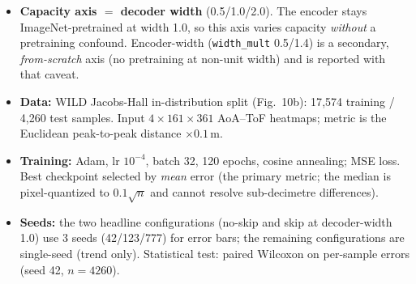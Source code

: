 \documentclass[11pt]{article}
\begin{document}
\begin{itemize}[nosep,leftmargin=1.4em]
\item \textbf{Capacity axis $=$ decoder width} (0.5/1.0/2.0). The encoder stays
      ImageNet-pretrained at width 1.0, so this axis varies capacity \emph{without} a
      pretraining confound. Encoder-width (\texttt{width\_mult} 0.5/1.4) is a secondary,
      \emph{from-scratch} axis (no pretraining at non-unit width) and is reported with that caveat.
\item \textbf{Data:} WILD Jacobs-Hall in-distribution split (Fig.\ 10b): 17{,}574 training /
      4{,}260 test samples. Input $4\times161\times361$ AoA--ToF heatmaps; metric is the
      Euclidean peak-to-peak distance $\times0.1$\,m.
\item \textbf{Training:} Adam, lr $10^{-4}$, batch 32, 120 epochs, cosine annealing; MSE loss.
      Best checkpoint selected by \emph{mean} error (the primary metric; the median is
      pixel-quantized to $0.1\sqrt{n}$ and cannot resolve sub-decimetre differences).
\item \textbf{Seeds:} the two headline configurations (no-skip and skip at decoder-width 1.0)
      use 3 seeds (42/123/777) for error bars; the remaining configurations are single-seed
      (trend only). Statistical test: paired Wilcoxon on per-sample errors (seed 42, $n=4260$).
\end{itemize}

\end{document}
